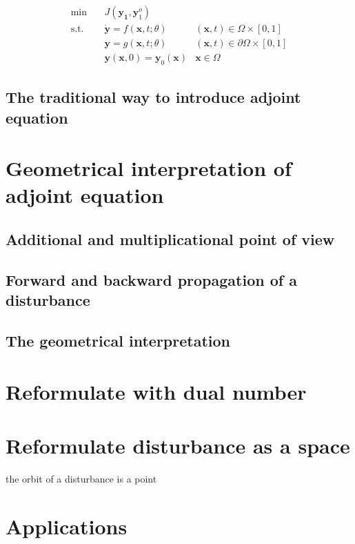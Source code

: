 \documentclass{article}
\begin{document}
$$
\begin{array}{rcll}
\min &~& J(\mathbf{y_1}, \mathbf{y}_1^o) & \\
\mathrm{s.t.} &~& \dot{\mathbf{y}} = f(\mathbf{x}, t; \theta) & (\mathbf{x}, t) \in \Omega \times [0, 1] \\
&~& \mathbf{y} = g(\mathbf{x}, t; \theta) & (\mathbf{x}, t) \in \partial \Omega \times [0, 1] \\
&~& \mathbf{y}(\mathbf{x}, 0) = \mathbf{y}_0(\mathbf{x}) & \mathbf{x} \in \Omega
\end{array}
$$

\subsection{The traditional way to introduce adjoint equation}


\section{Geometrical interpretation of adjoint equation}

\subsection{Additional and multiplicational point of view}

\subsection{Forward and backward propagation of a disturbance}

\subsection{The geometrical interpretation}


\section{Reformulate with dual number}


\section{Reformulate disturbance as a space}

the orbit of a disturbance is a point

\section{Applications}



\end{document}
